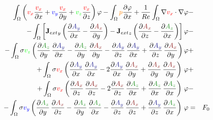 \documentclass[smallextended]{svjour3}       %
\begin{document}
		\begin{eqnarray}
			\int_{\Omega} \left(\textcolor{red}{v_x} \frac{\textcolor{red}{v_x}}{\partial x} + \textcolor{blu}{v_y} \frac{\textcolor{red}{v_x}}{\partial y} + \textcolor{gre}{v_z} \frac{\textcolor{red}{v_x}}{\partial z}\right) \varphi
			- \int_{\Omega} \textcolor{orange}{p} \frac{\partial \varphi}{\partial x}
			+ \frac{1}{Re} \int_{\Omega} \nabla \textcolor{red}{v_x} \cdot \nabla \varphi
			\nonumber & -\\
			- \int_{\Omega} \left[{\mathbf{J}_{ext}}_y \left(\frac{\partial \textcolor{darkblu}{A_y}}{\partial x} - \frac{\partial \textcolor{darkred}{A_x}}{\partial y}\right) - {\mathbf{J}_{ext}}_z \left(\frac{\partial \textcolor{darkred}{A_x}}{\partial z} - \frac{\partial \textcolor{darkgre}{A_z}}{\partial x}\right)\right] \varphi			
			\nonumber & -\\
			- \int_{\Omega} \sigma \textcolor{gre}{v_z} \left(\frac{\partial \textcolor{darkgre}{A_z}}{\partial y}\,\frac{\partial \textcolor{darkblu}{A_y}}{\partial x} - \frac{\partial \textcolor{darkgre}{A_z}}{\partial y}\,\frac{\partial \textcolor{darkred}{A_x}}{\partial y} - \frac{\partial \textcolor{darkblu}{A_y}}{\partial z}\,\frac{\partial \textcolor{darkblu}{A_y}}{\partial x} + \frac{\partial \textcolor{darkblu}{A_y}}{\partial z}\,\frac{\partial \textcolor{darkred}{A_x}}{\partial y} \right) \varphi& +\nonumber \\			
			+ \int_{\Omega} \sigma \textcolor{red}{v_x} \left(\frac{\partial \textcolor{darkblu}{A_y}}{\partial x}\,\frac{\partial \textcolor{darkblu}{A_y}}{\partial x} - 2 \frac{\partial \textcolor{darkblu}{A_y}}{\partial x}\,\frac{\partial \textcolor{darkred}{A_x}}{\partial y} + \frac{\partial \textcolor{darkred}{A_x}}{\partial y}\,\frac{\partial \textcolor{darkred}{A_x}}{\partial y} \right)\, \varphi& +\nonumber \\			
			+ \int_{\Omega} \sigma \textcolor{red}{v_x} \left(\frac{\partial \textcolor{darkred}{A_x}}{\partial z}\,\frac{\partial \textcolor{darkred}{A_x}}{\partial z} - 2 \frac{\partial \textcolor{darkred}{A_x}}{\partial z}\,\frac{\partial \textcolor{darkgre}{A_z}}{\partial x} + \frac{\partial \textcolor{darkgre}{A_z}}{\partial x}\,\frac{\partial \textcolor{darkgre}{A_z}}{\partial x} \right)\, \varphi& -\nonumber \\			
			- \int_{\Omega} \sigma \textcolor{blu}{v_y} \left(\frac{\partial \textcolor{darkgre}{A_z}}{\partial y}\,\frac{\partial \textcolor{darkred}{A_x}}{\partial z} - \frac{\partial \textcolor{darkgre}{A_z}}{\partial y}\,\frac{\partial \textcolor{darkgre}{A_z}}{\partial x} - \frac{\partial \textcolor{darkblu}{A_y}}{\partial z}\,\frac{\partial \textcolor{darkred}{A_x}}{\partial z}  + \frac{\partial \textcolor{darkblu}{A_y}}{\partial z}\,\frac{\partial \textcolor{darkgre}{A_z}}{\partial x} \right)\, \varphi& = & F_0\\			

\end{eqnarray}
\end{document}
